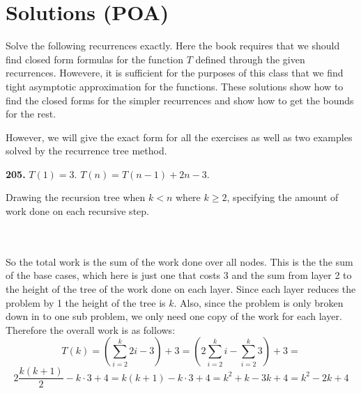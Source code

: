 \documentclass{article}
\renewcommand{\geq}{\geqslant}
\begin{document}
\section*{Solutions (POA)}
Solve the following recurrences exactly. Here the book requires that we should find closed form formulas for the function $T$ defined through the given recurrences. Howevere, it is sufficient for the purposes of this class that we find tight asymptotic approximation for the functions. These solutions show how to find the closed forms for the simpler recurrences and show how to get the bounds for the rest.

However, we will give the exact form for all the exercises as well as two examples solved by the recurrence tree method.

\noindent\textbf{205.} $T(1) = 3$. $T(n) = T(n - 1) + 2n - 3$.

Drawing the recursion tree when $k < n$ where $k \geq 2 $, specifying the amount of work done on each recursive step.\\\\
\\
So the total work is the sum of the work done over all nodes. This is the the sum of the base cases, which here is just one that costs $3$ and the sum from layer 2 to the height of the tree of the work done on each layer. Since each layer reduces the problem by 1 the height of the tree is $k$. Also, since the problem is only broken down in to one sub problem, we only need one copy of the work for each layer. Therefore the overall work is as follows:
$$
T(k) = \left( \sum_{i=2}^{k}{2i-3} \right) + 3 =
\left( 2\sum_{i=2}^{k}{i} - \sum_{i=2}^{k}{3} \right) + 3 = 
$$
$$
2\frac{k(k+1)}{2} - k \cdot 3 + 4 =
k(k+1) - k \cdot 3 + 4 = k^2 + k - 3k + 4 = k^2 -2k + 4$$
\end{document}
